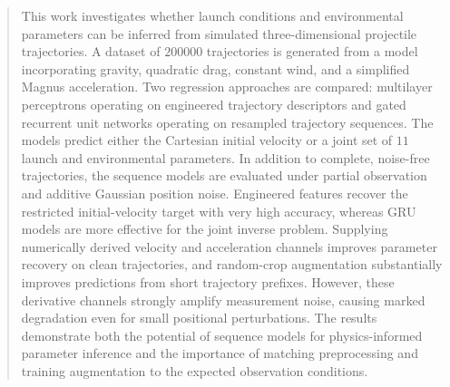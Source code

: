 \begin{abstract}
    This work investigates whether launch conditions and environmental parameters can be inferred from simulated three-dimensional projectile trajectories. A dataset of $200000$ trajectories is generated from a model incorporating gravity, quadratic drag, constant wind, and a simplified Magnus acceleration. Two regression approaches are compared: multilayer perceptrons operating on engineered trajectory descriptors and gated recurrent unit networks operating on resampled trajectory sequences. The models predict either the Cartesian initial velocity or a joint set of $11$ launch and environmental parameters. In addition to complete, noise-free trajectories, the sequence models are evaluated under partial observation and additive Gaussian position noise. Engineered features recover the restricted initial-velocity target with very high accuracy, whereas GRU models are more effective for the joint inverse problem. Supplying numerically derived velocity and acceleration channels improves parameter recovery on clean trajectories, and random-crop augmentation substantially improves predictions from short trajectory prefixes. However, these derivative channels strongly amplify measurement noise, causing marked degradation even for small positional perturbations. The results demonstrate both the potential of sequence models for physics-informed parameter inference and the importance of matching preprocessing and training augmentation to the expected observation conditions.
\end{abstract}
